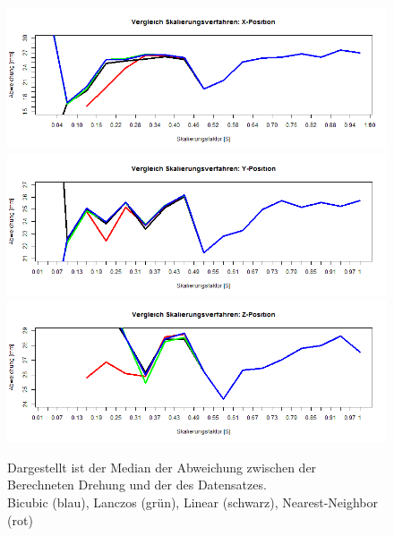 \begin{figure}
	\centering
	\includegraphics[width=\linewidth]{img_Skalierung/Skal_Diff_TX}
	\includegraphics[width=\linewidth]{img_Skalierung/Skal_Diff_TY}
	\includegraphics[width=\linewidth]{img_Skalierung/Skal_Diff_TZ}
	\caption{Dargestellt ist der Median der Abweichung zwischen der Berechneten Drehung und der des Datensatzes.\\
		Bicubic (blau), Lanczos (grün), Linear (schwarz), Nearest-Neighbor (rot)}
	\label{img_Pos_Dif}
\end{figure}

